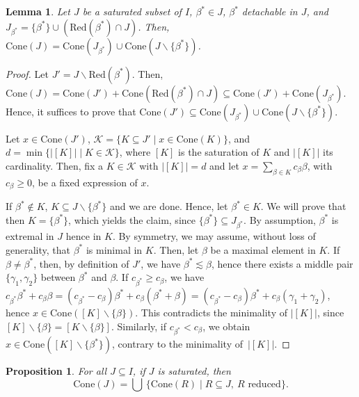 \documentclass[10pt]{amsart}
\newtheorem{pro}[thm]{Proposition}
\newtheorem{lem}[thm]{Lemma}
\theoremstyle{definition}
\theoremstyle{remark}
\newcommand\mc{\mathcal}
\newcommand\smeno{\smallsetminus}
\newcommand\cone{\mathrm{Cone}}
\newcommand\be{\beta}
\newcommand\ga{\gamma}
\newcommand\red{\mathrm{Red}}
\begin{document}
\begin{lem}\label{lem:coni-detachable}
Let $J$ be a saturated subset of $I$, $\be^*\in J$,  $\be^*$ detachable in  $J$, and $J_{\be^*}=\{\be^*\}\cup (\red(\be^*)\cap J)$. Then, $\cone(J)=\cone(J_{\be^*})\cup \cone(J\smeno\{\be^*\})$.
\end{lem}

\begin{proof}
Let $J'=J\smeno \red(\be^*)$. 
Then, $\cone(J)=\cone(J')+ \cone(\red(\be^*)\cap J)\subseteq
\cone(J')+ \cone(J_{\be^*}).$ 
Hence, it suffices to prove that $\cone(J')\subseteq \cone(J_{\be^*})\cup \cone(J\smeno\{\be^*\})$. 

\par
Let $x\in\cone(J')$,  $\mc K=\{K\subseteq J'\mid x\in \cone(K)\}$, and $d=\min\{|[K]|\mid K\in \mc K\}$, where $[K]$ is the saturation of $K$ and $|[K]|$ its cardinality. 
Then,  fix a $K\in \mc K$ with $|[K]|=d$ and let  $x=\sum\limits_{\be\in K}c_\be\be$, with $c_\be\geq 0$,  be a fixed expression of $x$.
\par 
If $\be^*\not\in K$, $K\subseteq J\smeno\{\be^*\}$ and we are done. 
Hence, let $\be^*\in K$. 
We will prove that then $K=\{\be^*\}$, which yields the claim, since $\{\be^*\}\subseteq J_{\be^*}$.
By assumption, $\be^*$ is extremal in $J$ hence in $K$. 
By symmetry, we may assume, without loss of generality, that $\be^*$ is minimal in $K$. 
Then, let $\be$ be a maximal element in $K$. 
If $\be\neq \be^*$, then, by definition of $J'$, we have $\be^*\lesssim \be$, hence there exists a middle pair $\{\ga_1, \ga_2\}$ between $\be^*$ and $\be$.
If $c_{\be^*}\geq c_\be$, we have $c_{\be^*}\be^*+c_\be\be=(c_{\be^*}-c_\be)\be^*+c_\be(\be^*+\be)=
(c_{\be^*}-c_\be)\be^*+c_\be(\ga_1+\ga_2)$, hence $x\in \cone([K]\smeno \{\be\})$. 
This contradicts the minimality of $|[K]|$, since
$[K]\smeno\{\be\}=[K\smeno\{\be\}]$.
Similarly, if $c_{\be^*}< c_\be$, we obtain $x\in \cone([K]\smeno \{\be^*\})$, contrary to the minimality of~$|[K]|$. 
\end{proof}

\begin{pro}\label{pro:cover}
For all $J\subseteq I$, if $J$ is saturated, then
$$
\cone(J)=\bigcup\,\{\cone(R)\mid R\subseteq J, \  R \text{ reduced}\}.
$$
\end{pro}
\end{document}
